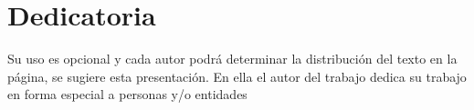 \chapter*{Dedicatoria}

Su uso es opcional y cada autor podrá determinar la distribución del texto en la página, se sugiere esta presentación. En ella el autor del trabajo dedica su trabajo en forma especial a personas y/o entidades